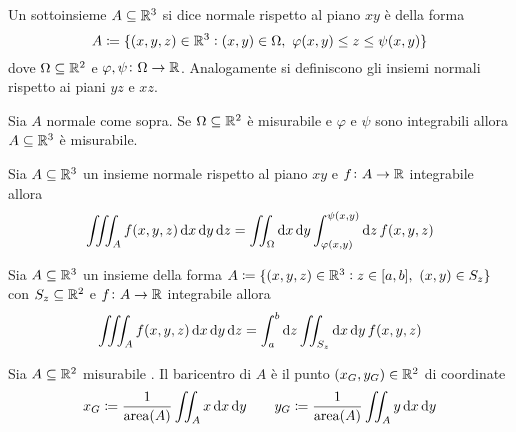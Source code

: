 \begin{definition}
	Un sottoinsieme $ A \subseteq \mathbb{R}^3 $ si dice normale rispetto al piano $ xy $ è della forma
	\begin{equation}
		A \coloneqq \{(x, y, z) \in \mathbb{R}^3 : (x, y) \in \Omega, \ \varphi(x, y) \leq z \leq \psi(x, y)\}
	\end{equation}
	dove $ \Omega \subseteq \mathbb{R}^2 $ e $ \varphi, \psi \colon \Omega \to \mathbb{R} $. Analogamente si definiscono gli insiemi normali rispetto ai piani $ yz $ e $ xz $.
\end{definition}

\begin{prop}
	Sia $ A $ normale come sopra. Se $ \Omega \subseteq \mathbb{R}^2 $ è misurabile e $ \varphi $ e $ \psi $ sono integrabili allora $ A \subseteq \mathbb{R}^3 $ è misurabile.
\end{prop}

\begin{prop}
	Sia $ A \subseteq \mathbb{R}^3 $ un insieme normale rispetto al piano $ xy $ e $ f \colon A \to \mathbb{R} $ integrabile allora
	\begin{equation}
		\iiint_{A}f(x, y, z) \dif{x} \dif{y} \dif{z} = \iint_{\Omega} \dif{x} \dif{y} \int_{\varphi(x, y)}^{\psi(x, y)} \dif{z} \, f(x, y, z)
	\end{equation}
\end{prop}

\begin{prop} \label{prop:intpercolonne}
	Sia $ A \subseteq \mathbb{R}^3 $ un insieme della forma $ A \coloneqq \{(x, y, z) \in \mathbb{R}^3 : z \in [a, b], \ (x, y) \in S_z\} $ con $ S_z \subseteq \mathbb{R}^2 $ e $ f \colon A \to \mathbb{R} $ integrabile allora
	\begin{equation}
	\iiint_{A}f(x, y, z) \dif{x} \dif{y} \dif{z} = \int_{a}^{b} \dif{z} \iint_{S_z} \dif{x} \dif{y} \, f(x, y, z)
	\end{equation}
\end{prop}

\begin{definition}[baricentro]
	Sia $ A \subseteq \mathbb{R}^2 $ misurabile . Il baricentro di $ A $ è il punto $ (x_G, y_G) \in \mathbb{R}^2 $ di coordinate
	\begin{equation}
		x_G \coloneqq \frac{1}{\mathrm{area}(A)} \iint_{A} x \dif{x} \dif{y} \qquad y_G \coloneqq \frac{1}{\mathrm{area}(A)} \iint_{A} y \dif{x} \dif{y}
	\end{equation}
\end{definition}

